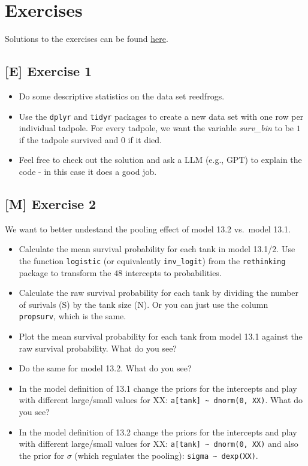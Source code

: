 \documentclass[
]{book}
\providecommand{\tightlist}{%
  \setlength{\itemsep}{0pt}\setlength{\parskip}{0pt}}
\begin{document}
\section{Exercises}\label{exercises-1}

Solutions to the exercises can be found
\href{https://github.com/jdegenfellner/Script_QM3_ZHAW/tree/main/Solutions_Exercises}{here}.

\subsection{{[}E{]} Exercise 1}\label{exercise1_LMM}

\begin{itemize}
\tightlist
\item
  Do some descriptive statistics on the data set reedfrogs.
\item
  Use the \texttt{dplyr} and \texttt{tidyr} packages to create a new data set with one row per individual tadpole.
  For every tadpole, we want the variable \emph{surv\_bin} to be \(1\) if the tadpole survived and \(0\) if it died.
\item
  Feel free to check out the solution and ask a LLM (e.g., GPT) to explain the code -
  in this case it does a good job.
\end{itemize}

\subsection{{[}M{]} Exercise 2}\label{exercise2_LMM}

We want to better undestand the pooling effect of model 13.2 vs.~model 13.1.

\begin{itemize}
\tightlist
\item
  Calculate the mean survival probability for each tank in model 13.1/2. Use the function \texttt{logistic}
  (or equivalently \texttt{inv\_logit}) from the \texttt{rethinking} package to transform the \(48\) intercepts to probabilities.
\item
  Calculate the raw survival probability for each tank by dividing the number of surivals (S) by
  the tank size (N). Or you can just use the column \texttt{propsurv}, which is the same.
\item
  Plot the mean survival probability for each tank from model 13.1 against the raw survival probability.
  What do you see?
\item
  Do the same for model 13.2.
  What do you see?
\item
  In the model definition of 13.1 change the priors for the intercepts and
  play with different large/small values for XX: \texttt{a{[}tank{]}\ \textasciitilde{}\ dnorm(0,\ XX)}.
  What do you see?
\item
  In the model definition of 13.2 change the priors for the intercepts and
  play with different large/small values for XX: \texttt{a{[}tank{]}\ \textasciitilde{}\ dnorm(0,\ XX)} and
  also the prior for \(\sigma\) (which regulates the pooling): \texttt{sigma\ \textasciitilde{}\ dexp(XX)}.
\end{itemize}
\end{document}
